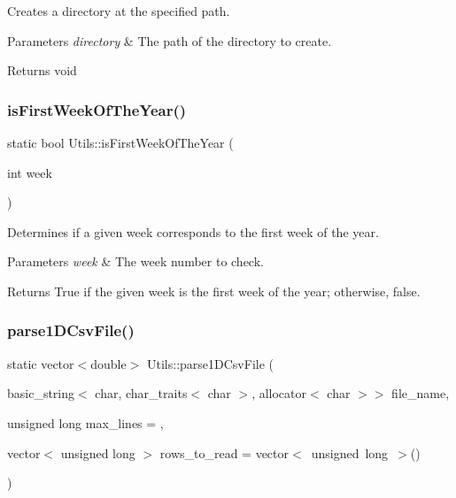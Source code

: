 Creates a directory at the specified path. 


\begin{DoxyParams}{Parameters}
{\em directory} & The path of the directory to create.\\
\hline
\end{DoxyParams}
\begin{DoxyReturn}{Returns}
void 
\end{DoxyReturn}
\mbox{\label{classUtils_a3e4c6e935243165c89f059c5fedf2945}} 
\subsubsection{\texorpdfstring{is\+First\+Week\+Of\+The\+Year()}{isFirstWeekOfTheYear()}}
{\footnotesize\ttfamily static bool Utils\+::is\+First\+Week\+Of\+The\+Year (\begin{DoxyParamCaption}\item[{int}]{week }\end{DoxyParamCaption})\hspace{0.3cm}{\ttfamily [static]}}



Determines if a given week corresponds to the first week of the year. 


\begin{DoxyParams}{Parameters}
{\em week} & The week number to check. \\
\hline
\end{DoxyParams}
\begin{DoxyReturn}{Returns}
True if the given week is the first week of the year; otherwise, false. 
\end{DoxyReturn}
\mbox{\label{classUtils_a42fdb9455286213b32abf5f111c21fd4}} 
\subsubsection{\texorpdfstring{parse1\+D\+Csv\+File()}{parse1DCsvFile()}}
{\footnotesize\ttfamily static vector$<$double$>$ Utils\+::parse1\+D\+Csv\+File (\begin{DoxyParamCaption}\item[{basic\+\_\+string$<$ char, char\+\_\+traits$<$ char $>$, allocator$<$ char $>$$>$}]{file\+\_\+name,  }\item[{unsigned long}]{max\+\_\+lines = {},  }\item[{vector$<$ unsigned long $>$}]{rows\+\_\+to\+\_\+read = {\ttfamily vector$<$~unsigned~long~$>$()} }\end{DoxyParamCaption})\hspace{0.3cm}{\ttfamily [static]}}



